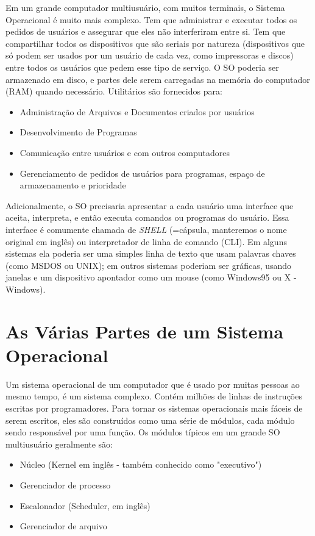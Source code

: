Em um grande computador multiusuário, com muitos terminais, o Sistema Operacional é muito mais complexo. Tem que administrar e executar todos os pedidos de usuários e assegurar que eles não interferiram entre si. Tem que compartilhar todos os dispositivos que são seriais por natureza (dispositivos que só podem ser usados por um usuário de cada vez, como impressoras e discos) entre todos os usuários que pedem esse tipo de serviço. O SO poderia ser armazenado em disco, e partes dele serem carregadas na memória do computador (RAM) quando necessário. Utilitários são fornecidos para:

\begin{itemize}
\item Administração de Arquivos e Documentos criados por usuários
\item Desenvolvimento de Programas
\item Comunicação entre usuários e com outros computadores
\item Gerenciamento de pedidos de usuários para programas, espaço de armazenamento e prioridade
\end{itemize}

Adicionalmente, o SO precisaria apresentar a cada usuário uma interface que aceita, interpreta, e então executa comandos ou programas do usuário. Essa interface é comumente chamada de \textit{SHELL} (=cápsula, manteremos o nome original em inglês) ou interpretador de linha de comando (CLI). Em alguns sistemas ela poderia ser uma simples linha de texto que usam palavras chaves (como MSDOS ou UNIX); em outros sistemas poderiam ser gráficas, usando janelas e um dispositivo apontador como um mouse (como Windows95 ou X - Windows).

\section{As Várias Partes de um Sistema Operacional}

Um sistema operacional de um computador que é usado por muitas pessoas ao mesmo tempo, é um sistema complexo. Contém milhões de linhas de instruções escritas por programadores. Para tornar os sistemas operacionais mais fáceis de serem escritos, eles são construídos como uma série de módulos, cada módulo sendo responsável por uma função. Os módulos típicos em um grande SO multiusuário geralmente são:

\begin{itemize}
\item Núcleo (Kernel em inglês - também conhecido como "executivo")
\item Gerenciador de processo
\item Escalonador (Scheduler, em inglês)
\item Gerenciador de arquivo
\end{itemize}

